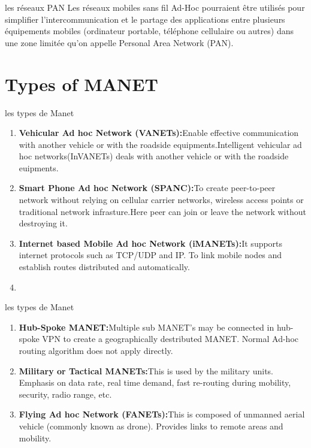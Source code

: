 \documentclass[11pt]{beamer}
\begin{document}
\begin{frame}
\begin{exampleblock}{les réseaux PAN}
Les réseaux mobiles sans fil Ad-Hoc pourraient être utilisés pour simplifier l'intercommunication et le partage des applications entre plusieurs équipements mobiles
(ordinateur portable, téléphone cellulaire ou autres) dans une zone limitée qu’on appelle Personal Area Network (PAN).
\end{exampleblock}
\end{frame}
\section{Types of MANET }
\begin{frame}{les types de Manet}
\begin{enumerate}
\item \textbf{Vehicular Ad hoc Network (VANETs):}Enable effective communication with another vehicle or with the roadside equipments.Intelligent vehicular ad hoc networks(InVANETs) deals with another vehicle or with the roadside euipments.
\item \textbf{Smart Phone Ad hoc Network (SPANC):}To create peer-to-peer network without relying on cellular carrier networks, wireless access points or traditional network infrasture.Here peer can join or leave the network without destroying it.

\item \textbf{Internet based Mobile Ad hoc Network (iMANETs):}It supports internet protocols such as TCP/UDP and IP. To link mobile nodes and establish routes distributed and automatically.

\item \textbf{}
\end{enumerate}
\end{frame}
\begin{frame}{les types de Manet}
\begin{enumerate}
\item \textbf{Hub-Spoke MANET:}Multiple sub MANET’s may be connected in hub-spoke VPN to create a geographically destributed MANET. Normal Ad-hoc routing algorithm does not apply directly.
\item \textbf{Military or Tactical MANETs:}This is used by the military units. Emphasis on data rate, real time demand, fast re-routing during mobility, security, radio range, etc.
\item \textbf{Flying Ad hoc Network (FANETs):}This is composed of unmanned aerial vehicle (commonly known as drone). Provides links to remote areas and mobility.
\end{enumerate}
\end{frame}
\end{document}
